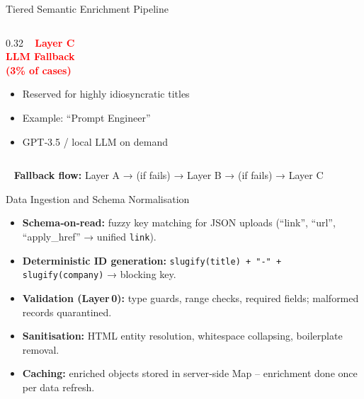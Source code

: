 \documentclass[aspectratio=169, 10pt]{beamer}
\begin{document}
\begin{frame}{Tiered Semantic Enrichment Pipeline}
\begin{columns}[T]
\begin{column}{0.32\textwidth}
\centering
\textcolor{red}{\faRobot~ \textbf{Layer C}} \\
\textcolor{red}{\textbf{LLM Fallback}} \\
\textcolor{red}{\textbf{(3\% of cases)}}
\vspace{0.2cm}

\begin{itemize}
\item Reserved for highly idiosyncratic titles
\item Example: “Prompt Engineer”
\item GPT‑3.5 / local LLM on demand
\end{itemize}
\end{column}
\end{columns}

\vspace{0.5cm}
\centering
\textcolor{myteal}{\faLongArrowAltRight}~ \textbf{Fallback flow:} Layer A → (if fails) → Layer B → (if fails) → Layer C
\end{frame}

\begin{frame}{Data Ingestion and Schema Normalisation}
\begin{itemize}
\item \textbf{Schema‑on‑read:} fuzzy key matching for JSON uploads (“link”, “url”, “apply\_href” → unified \texttt{link}).
\item \textbf{Deterministic ID generation:} \texttt{slugify(title) + "-" + slugify(company)} → blocking key.
\item \textbf{Validation (Layer 0):} type guards, range checks, required fields; malformed records quarantined.
\item \textbf{Sanitisation:} HTML entity resolution, whitespace collapsing, boilerplate removal.
\item \textbf{Caching:} enriched objects stored in server‑side Map – enrichment done once per data refresh.
\end{itemize}
\end{frame}
\end{document}
